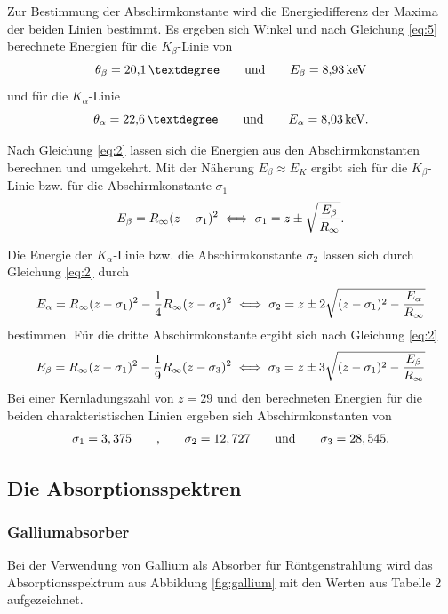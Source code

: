 Zur Bestimmung der Abschirmkonstante wird die Energiedifferenz der Maxima der beiden Linien bestimmt.
Es ergeben sich Winkel und nach Gleichung \ref{eq:5} berechnete Energien für die $K_\beta$-Linie von 
\begin{equation}
  \theta_\beta = \SI{20,1}{°} \qquad \text{und} \qquad E_\beta = \SI{8,93}{keV}  \notag
\end{equation}
und für die $K_\alpha$-Linie
\begin{equation}
  \theta_\alpha = \SI{22,6}{°} \qquad \text{und} \qquad E_\alpha = \SI{8,03}{keV}. \notag
\end{equation}

Nach Gleichung \ref{eq:2} lassen sich die Energien aus den Abschirmkonstanten berechnen und umgekehrt.
Mit der Näherung $E_\beta \approx E_K$ ergibt sich für die $K_\beta$-Linie bzw. für die Abschirmkonstante $\sigma_1$
\begin{equation}
  E_\beta =  R_\infty (z-\sigma_1)^{2}  \iff \sigma_1 = z \pm \sqrt{\frac{E_\beta}{R_\infty}}.  \notag
\end{equation}

Die Energie der $K_\alpha$-Linie bzw. die Abschirmkonstante $\sigma_2$ lassen sich durch Gleichung \ref{eq:2} durch
\begin{equation}
  E_\alpha = R_\infty (z-\sigma_1)^{2} - \frac{1}{4} R_\infty (z-\sigma_2)^{2} \iff \sigma_2 = z \pm 2 \sqrt{(z-\sigma_1)^{2} - \frac{E_\alpha}{R_\infty}}  \notag
\end{equation}
bestimmen.
Für die dritte Abschirmkonstante ergibt sich nach Gleichung \ref{eq:2}
\begin{equation}
    E_\beta = R_\infty (z - \sigma_1)^{2} - \frac{1}{9} R_\infty (z-\sigma_3)^{2} \iff \sigma_3 = z \pm 3 \sqrt{(z-\sigma_1)^{2} - \frac{E_\beta}{R_\infty}}    \notag
\end{equation}
Bei einer Kernladungszahl von $z = 29$ und den berechneten Energien für die beiden charakteristischen Linien ergeben sich Abschirmkonstanten von
\begin{equation}
  \sigma_1 = 3,375  \qquad \text{,} \qquad \sigma_2 = 12,727 \qquad \text{und} \qquad \sigma_3 = 28,545. \notag
\end{equation}


\subsection{Die Absorptionsspektren}
\subsubsection{Galliumabsorber}
Bei der Verwendung von Gallium als Absorber für Röntgenstrahlung wird das Absorptionsspektrum aus Abbildung \ref{fig:gallium} mit den Werten aus Tabelle 2 aufgezeichnet.

